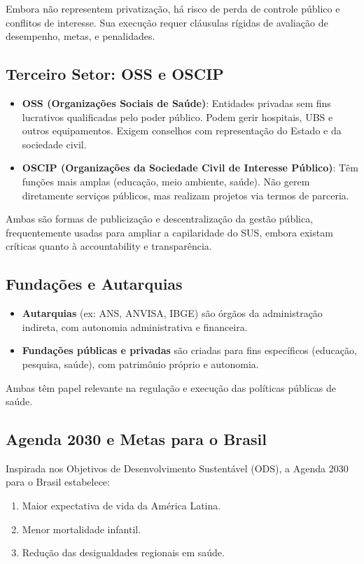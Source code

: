 \documentclass[a4paper,12pt]{article}
\begin{document}
Embora não representem privatização, há risco de perda de controle público e conflitos de interesse. Sua execução requer cláusulas rígidas de avaliação de desempenho, metas, e penalidades.
\subsection{Terceiro Setor: OSS e OSCIP}
\label{sec:org9aa4878}
\begin{itemize}
\item \textbf{\textbf{OSS (Organizações Sociais de Saúde)}}: Entidades privadas sem fins lucrativos qualificadas pelo poder público. Podem gerir hospitais, UBS e outros equipamentos. Exigem conselhos com representação do Estado e da sociedade civil.
\item \textbf{\textbf{OSCIP (Organizações da Sociedade Civil de Interesse Público)}}: Têm funções mais amplas (educação, meio ambiente, saúde). Não gerem diretamente serviços públicos, mas realizam projetos via termos de parceria.
\end{itemize}

Ambas são formas de publicização e descentralização da gestão pública, frequentemente usadas para ampliar a capilaridade do SUS, embora existam críticas quanto à accountability e transparência.
\subsection{Fundações e Autarquias}
\label{sec:org3fe4242}
\begin{itemize}
\item \textbf{\textbf{Autarquias}} (ex: ANS, ANVISA, IBGE) são órgãos da administração indireta, com autonomia administrativa e financeira.
\item \textbf{\textbf{Fundações públicas e privadas}} são criadas para fins específicos (educação, pesquisa, saúde), com patrimônio próprio e autonomia.
\end{itemize}

Ambas têm papel relevante na regulação e execução das políticas públicas de saúde.
\subsection{Agenda 2030 e Metas para o Brasil}
\label{sec:org48dfd19}
Inspirada nos Objetivos de Desenvolvimento Sustentável (ODS), a Agenda 2030 para o Brasil estabelece:
\begin{enumerate}
\item Maior expectativa de vida da América Latina.
\item Menor mortalidade infantil.
\item Redução das desigualdades regionais em saúde.
\end{enumerate}
\end{document}

